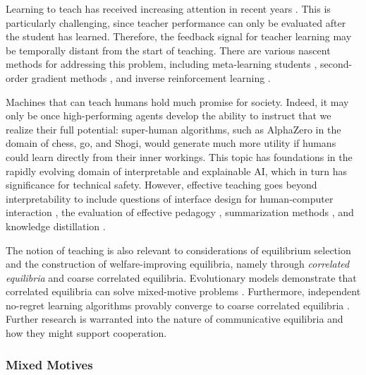 \documentclass[11pt, a4paper, logo, onecolumn, nonumbering]{deepmind}
\begin{document}
Learning to teach has received increasing attention in recent years \cite{da2017simultaneously, beck1998learning, omidshafiei2019learning, zimmer2014teacher}. This is particularly challenging, since teacher performance can only be evaluated after the student has learned. Therefore, the feedback signal for teacher learning may be temporally distant from the start of teaching. There are various nascent methods for addressing this problem, including meta-learning students \cite{zheng2020ai}, second-order gradient methods \cite{foerster2017learning, letcher2018stable}, and inverse reinforcement learning \cite{cakmak2012algorithmic}.

Machines that can teach humans hold much promise for society. Indeed, it may only be once high-performing agents develop the ability to instruct that we realize their full potential: super-human algorithms, such as AlphaZero \cite{silver2017mastering} in the domain of chess, go, and Shogi, would generate much more utility if humans could learn directly from their inner workings. This topic has foundations in the rapidly evolving domain of interpretable and explainable AI, which in turn has significance for technical safety. However, effective teaching goes beyond interpretability to include questions of interface design for human-computer interaction \cite{shneiderman2016designing}, the evaluation of effective pedagogy \cite{goe2008approaches}, summarization methods \cite{nallapati2016abstractive, Zhang2019HIBERT}, and knowledge distillation \cite{Yim2017Gift}. %

The notion of teaching is also relevant to considerations of equilibrium selection and the construction of welfare-improving equilibria, namely through \textit{correlated equilibria} \cite{AUMANN197467} and coarse correlated equilibria. 
Evolutionary models demonstrate that correlated equilibria can solve mixed-motive problems \cite{morsky2019evolution, LeePenagos2016LearningTC}. Furthermore, independent no-regret learning algorithms provably converge to coarse correlated equilibria \cite{hart2000simple}. Further research is warranted into the nature of communicative equilibria and how they might support cooperation.

\subsubsection{Mixed Motives}
\end{document}
